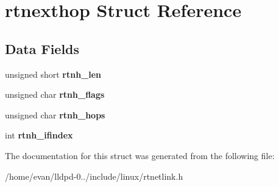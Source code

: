 \section{rtnexthop \-Struct \-Reference}
\label{structrtnexthop}
\subsection*{\-Data \-Fields}
\begin{DoxyCompactItemize}
\item 
unsigned short {\bfseries rtnh\-\_\-len}\label{structrtnexthop_a24f51b7cfc75f47ba852c10fb70b0282}

\item 
unsigned char {\bfseries rtnh\-\_\-flags}\label{structrtnexthop_a42c9488cea5ed54c311125f18281c093}

\item 
unsigned char {\bfseries rtnh\-\_\-hops}\label{structrtnexthop_acb7c5f75ad28614860fb9b7400e67f69}

\item 
int {\bfseries rtnh\-\_\-ifindex}\label{structrtnexthop_aeeef00380354aa86b75d62be8a20f28f}

\end{DoxyCompactItemize}


\-The documentation for this struct was generated from the following file\-:\begin{DoxyCompactItemize}
\item 
/home/evan/lldpd-\/0../include/linux/rtnetlink.\-h\end{DoxyCompactItemize}
